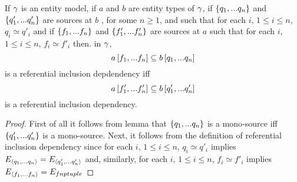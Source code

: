 \begin{lemma}
If $\gamma$ is an entity model, 
if $a$ and $b$ are entity types of  $\gamma$,  if $\left\{q_1,...q_n\right\}$
and $\left\{q'_1,...q'_n\right\}$ are sources at $b$ , for some $n \geq 1$,
and such that for each $i$, $1 \leq i \leq n$, $q_i \simeq q'_i$  
and if $\left\{f_1,...f_n\right\}$ and $\left\{f'_1,...f'_n\right\}$ are sources at $a$
such that for each $i$, $1 \leq i \leq n$, $f_i \simeq f'_i$
then. in $\gamma$, 
\begin{equation}
\label{incdequivalence1}
a\left[f_1,...f_n\right]\subseteq b\left[q_1,...q_n\right]
\end{equation}
is a referential inclusion depdendency iff
\begin{equation}
\label{incdequivalence2}
a\left[f'_1,...f'_n\right]\subseteq b\left[q'_1,...q'_n\right]
\end{equation}
is a referential inclusion dependency.

\end{lemma}
\begin{proof}
First of all it follows from lemma  that $\left\{q_1,...q_n\right\}$ is a mono-source iff
$\left\{q'_1,...q'_n\right\}$ is a mono-source.
Next, it follows from the definition of referential inclusion dependency
 since for each $i$, $1 \leq i \leq n$, $q_i \simeq q'_i$  implies $E_{\langle q_1,...q_n\rangle} =
E_{\langle q'_1,...q'_n\rangle}$ and,
similarly, for each $i$, $1 \leq i \leq n$, $f_i \simeq f'_i$  implies $E_{\langle f_1,...f_n\rangle} =
E_{\\fnptuple}$
\end{proof}

